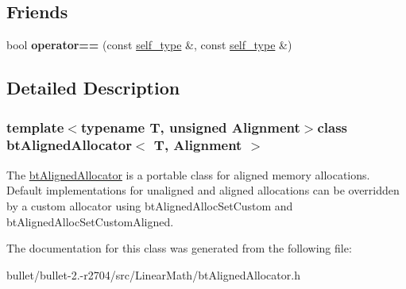 \subsection*{Friends}
\begin{DoxyCompactItemize}
\item 
\hypertarget{classbt_aligned_allocator_a925f6a7a595252ceb9a7c4be506f983c}{bool {\bfseries operator==} (const \hyperlink{classbt_aligned_allocator}{self\+\_\+type} \&, const \hyperlink{classbt_aligned_allocator}{self\+\_\+type} \&)}\label{classbt_aligned_allocator_a925f6a7a595252ceb9a7c4be506f983c}

\end{DoxyCompactItemize}


\subsection{Detailed Description}
\subsubsection*{template$<$typename T, unsigned Alignment$>$class bt\+Aligned\+Allocator$<$ T, Alignment $>$}

The \hyperlink{classbt_aligned_allocator}{bt\+Aligned\+Allocator} is a portable class for aligned memory allocations. Default implementations for unaligned and aligned allocations can be overridden by a custom allocator using bt\+Aligned\+Alloc\+Set\+Custom and bt\+Aligned\+Alloc\+Set\+Custom\+Aligned. 

The documentation for this class was generated from the following file\+:\begin{DoxyCompactItemize}
\item 
bullet/bullet-\/2.-\/r2704/src/\+Linear\+Math/bt\+Aligned\+Allocator.\+h\end{DoxyCompactItemize}
